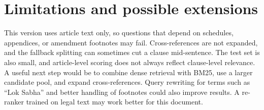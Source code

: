\documentclass[11pt,a4paper]{article}
\begin{document}
\section{Limitations and possible extensions}
This version uses article text only, so questions that depend on schedules, appendices, or amendment footnotes may fail. Cross-references are not expanded, and the fallback splitting can sometimes cut a clause mid-sentence. The test set is also small, and article-level scoring does not always reflect clause-level relevance. A useful next step would be to combine dense retrieval with BM25, use a larger candidate pool, and expand cross-references. Query rewriting for terms such as “Lok Sabha” and better handling of footnotes could also improve results. A re-ranker trained on legal text may work better for this document.
\end{document}
